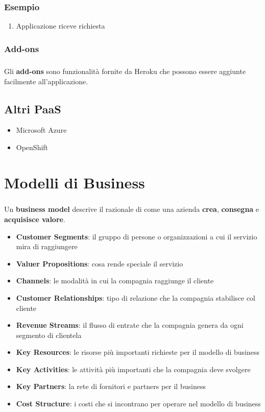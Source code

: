 \documentclass[a4paper, 12pt]{report}
\begin{document}
      \subsection{Esempio}
      \begin{enumerate}
        \item Applicazione riceve richiesta
      \end{enumerate}
      \subsection{Add-ons}
      \paragraph{}Gli \textbf{add-ons} sono funzionalità fornite da Heroku che possono essere aggiunte facilmente all'applicazione.
    \section{Altri PaaS}
    \begin{itemize}
      \item Microsoft Azure
      \item OpenShift
    \end{itemize}
  \chapter{Modelli di Business}
    \paragraph{}Un \textbf{business model} descrive il razionale di come una azienda \textbf{crea}, \textbf{consegna} e \textbf{acquisisce valore}.
    \begin{itemize}
      \item \textbf{Customer Segments}: il gruppo di persone o organizzazioni a cui il servizio mira di raggiungere
      \item \textbf{Valuer Propositions}: cosa rende speciale il servizio
      \item \textbf{Channels}: le modalità in cui la compagnia raggiunge il cliente
      \item \textbf{Customer Relationships}: tipo di relazione che la compagnia stabilisce col cliente 
      \item \textbf{Revenue Streams}: il flusso di entrate che la compagnia genera da ogni segmento di clientela
      \item \textbf{Key Resources}: le risorse più importanti richieste per il modello di business 
      \item \textbf{Key Activities}: le attività più importanti che la compagnia deve svolgere
      \item \textbf{Key Partners}: la rete di fornitori e partners per il business 
      \item \textbf{Cost Structure}: i costi che si incontrano per operare nel modello di business
    \end{itemize}
\end{document}
